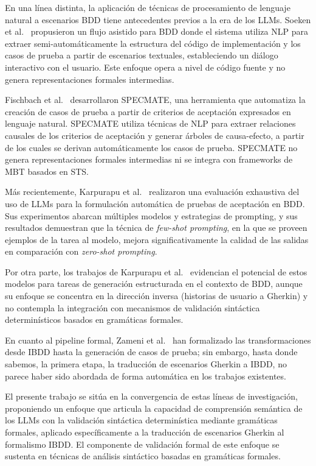 En una línea distinta, la aplicación de técnicas de procesamiento de lenguaje natural a escenarios BDD tiene antecedentes previos a la era de los LLMs. Soeken et al.~\cite{soeken2012nlp} propusieron un flujo asistido para BDD donde el sistema utiliza NLP para extraer semi-automáticamente la estructura del código de implementación y los casos de prueba a partir de escenarios textuales, estableciendo un diálogo interactivo con el usuario. Este enfoque opera a nivel de código fuente y no genera representaciones formales intermedias.

Fischbach et al.~\cite{fischbach2020specmate} desarrollaron SPECMATE, una herramienta que automatiza la creación de casos de prueba a partir de criterios de aceptación expresados en lenguaje natural. SPECMATE utiliza técnicas de NLP para extraer relaciones causales de los criterios de aceptación y generar árboles de causa-efecto, a partir de los cuales se derivan automáticamente los casos de prueba. SPECMATE no genera representaciones formales intermedias ni se integra con frameworks de MBT basados en STS.

Más recientemente, Karpurapu et al.~\cite{karpurapu2024llm} realizaron una evaluación exhaustiva del uso de LLMs para la formulación automática de pruebas de aceptación en BDD. Sus experimentos abarcan múltiples modelos y estrategias de prompting, y sus resultados demuestran que la técnica de \textit{few-shot prompting}, en la que se proveen ejemplos de la tarea al modelo, mejora significativamente la calidad de las salidas en comparación con \textit{zero-shot prompting}.

Por otra parte, los trabajos de Karpurapu et al.~\cite{karpurapu2024llm} evidencian el potencial de estos modelos para tareas de generación estructurada en el contexto de BDD, aunque su enfoque se concentra en la dirección inversa (historias de usuario a Gherkin) y no contempla la integración con mecanismos de validación sintáctica determinísticos basados en gramáticas formales.

En cuanto al pipeline formal, Zameni et al.~\cite{zameni2024ibdd, zameni2023bddts, zameni2025composition} han formalizado las transformaciones desde IBDD hasta la generación de casos de prueba; sin embargo, hasta donde sabemos, la primera etapa, la traducción de escenarios Gherkin a IBDD, no parece haber sido abordada de forma automática en los trabajos existentes.

El presente trabajo se sitúa en la convergencia de estas líneas de investigación, proponiendo un enfoque que articula la capacidad de comprensión semántica de los LLMs con la validación sintáctica determinística mediante gramáticas formales, aplicado específicamente a la traducción de escenarios Gherkin al formalismo IBDD. El componente de validación formal de este enfoque se sustenta en técnicas de análisis sintáctico basadas en gramáticas formales.

